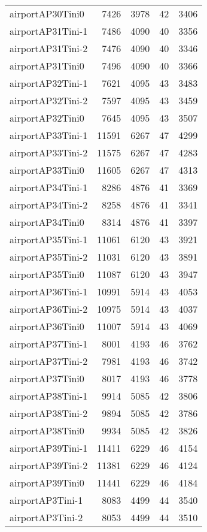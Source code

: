 \begin{longtable}{lrrrr}
airportAP30Tini0 & 7426 & 3978 & 42 & 3406 \\
airportAP31Tini-1 & 7486 & 4090 & 40 & 3356 \\
airportAP31Tini-2 & 7476 & 4090 & 40 & 3346 \\
airportAP31Tini0 & 7496 & 4090 & 40 & 3366 \\
airportAP32Tini-1 & 7621 & 4095 & 43 & 3483 \\
airportAP32Tini-2 & 7597 & 4095 & 43 & 3459 \\
airportAP32Tini0 & 7645 & 4095 & 43 & 3507 \\
airportAP33Tini-1 & 11591 & 6267 & 47 & 4299 \\
airportAP33Tini-2 & 11575 & 6267 & 47 & 4283 \\
airportAP33Tini0 & 11605 & 6267 & 47 & 4313 \\
airportAP34Tini-1 & 8286 & 4876 & 41 & 3369 \\
airportAP34Tini-2 & 8258 & 4876 & 41 & 3341 \\
airportAP34Tini0 & 8314 & 4876 & 41 & 3397 \\
airportAP35Tini-1 & 11061 & 6120 & 43 & 3921 \\
airportAP35Tini-2 & 11031 & 6120 & 43 & 3891 \\
airportAP35Tini0 & 11087 & 6120 & 43 & 3947 \\
airportAP36Tini-1 & 10991 & 5914 & 43 & 4053 \\
airportAP36Tini-2 & 10975 & 5914 & 43 & 4037 \\
airportAP36Tini0 & 11007 & 5914 & 43 & 4069 \\
airportAP37Tini-1 & 8001 & 4193 & 46 & 3762 \\
airportAP37Tini-2 & 7981 & 4193 & 46 & 3742 \\
airportAP37Tini0 & 8017 & 4193 & 46 & 3778 \\
airportAP38Tini-1 & 9914 & 5085 & 42 & 3806 \\
airportAP38Tini-2 & 9894 & 5085 & 42 & 3786 \\
airportAP38Tini0 & 9934 & 5085 & 42 & 3826 \\
airportAP39Tini-1 & 11411 & 6229 & 46 & 4154 \\
airportAP39Tini-2 & 11381 & 6229 & 46 & 4124 \\
airportAP39Tini0 & 11441 & 6229 & 46 & 4184 \\
airportAP3Tini-1 & 8083 & 4499 & 44 & 3540 \\
airportAP3Tini-2 & 8053 & 4499 & 44 & 3510 \\

\end{longtable}
